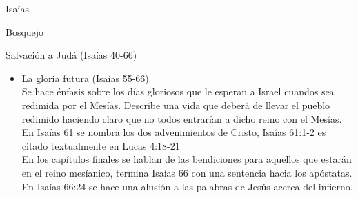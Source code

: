 \begin{section}{Isaías}
\begin{subsection}{Bosquejo}
\begin{subsubsection}{Salvación a Judá (Isaías 40-66)}
\begin{itemize}
					El sacrifico único del siervo provee una solución permanente al pecado del hombre. El siervo conocía con exactitud lo que era necesario para traer salvación al hombre. Isaías 53:12 menciona que la recompensa del siervo será la de gozar del botín de sus victorias espirituales. Murió, no como una víctima, imploró perdón para quienes lo estaban asesinando. En Jesucristo, este sueño profético se ha hecho realidad. Dios habló al munod por medio de un Isaías cuya boca había sido previamente cauterizada. No nos cabe la menor duda de que Isaías estaba profetizando acerca de Jesús.\\
					Los Isaías 54-55 hablan de la restauración de Israel y salvación eterna.
				\item La gloria futura (Isaías 55-66)\\
					Se hace énfasis sobre los días gloriosos que le esperan a Israel cuandos sea redimida por el Mesías. Describe una vida que deberá de llevar el pueblo redimido haciendo claro que no todos entrarían a dicho reino con el Mesías. \\
					En Isaías 61 se nombra los dos advenimientos de Cristo, Isaías 61:1-2 es citado textualmente en Lucas 4:18-21\\
					En los capítulos finales se hablan de las bendiciones para aquellos que estarán en el reino mesíanico, termina Isaías 66 con una sentencia hacia los apóstatas. En Isaías 66:24 se hace una alusión a las palabras de Jesús acerca del infierno. 
			\end{itemize}
		\end{subsubsection}
	\end{subsection}
\end{section}
%


